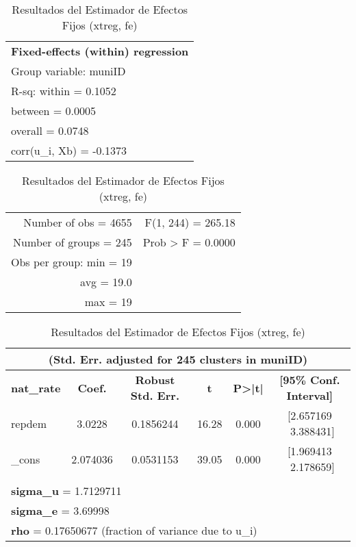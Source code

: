 \documentclass[12pt]{article}
\begin{document}
\begin{table}[H] %
    \centering
    \caption{Resultados del Estimador de Efectos Fijos (xtreg, fe)}
    \begin{tabular}{l l r}
        \multicolumn{3}{l}{\textbf{Fixed-effects (within) regression}} \\
        \multicolumn{3}{l}{Group variable: muniID} \\
        \hline
        \multicolumn{3}{l}{R-sq: \hspace{5mm} within = 0.1052} \\
        \multicolumn{3}{l}{\hspace{17mm} between = 0.0005} \\
        \multicolumn{3}{l}{\hspace{17mm} overall = 0.0748} \\
        \multicolumn{3}{l}{corr(u\_i, Xb) = -0.1373} \\
    \end{tabular}
    \begin{tabular}{r @{\hskip 1cm} r}
        Number of obs = 4655 & F(1, 244) = 265.18 \\
        Number of groups = 245 & Prob > F = 0.0000 \\
        Obs per group: min = 19 & \\
        \hspace{16mm} avg = 19.0 & \\
        \hspace{16mm} max = 19 & \\
    \end{tabular}

    \vspace{0.2cm}
    \begin{tabular}{l c c c c c}
        \multicolumn{6}{c}{(Std. Err. adjusted for 245 clusters in muniID)} \\
        \hline
        \textbf{nat\_rate} & \textbf{Coef.} & \textbf{Robust Std. Err.} & \textbf{t} & \textbf{P>|t|} & \textbf{[95\% Conf. Interval]} \\
        \hline
        repdem & 3.0228 & 0.1856244 & 16.28 & 0.000 & [2.657169 \ 3.388431] \\
        \_cons & 2.074036 & 0.0531153 & 39.05 & 0.000 & [1.969413 \ 2.178659] \\
        \hline
        \multicolumn{6}{l}{} \\
        \multicolumn{6}{l}{\textbf{sigma\_u} = 1.7129711} \\
        \multicolumn{6}{l}{\textbf{sigma\_e} = 3.69998} \\
        \multicolumn{6}{l}{\textbf{rho} = 0.17650677 \hspace{2mm} (fraction of variance due to u\_i)} \\
        \hline
    \end{tabular}
\end{table}
\end{document}

